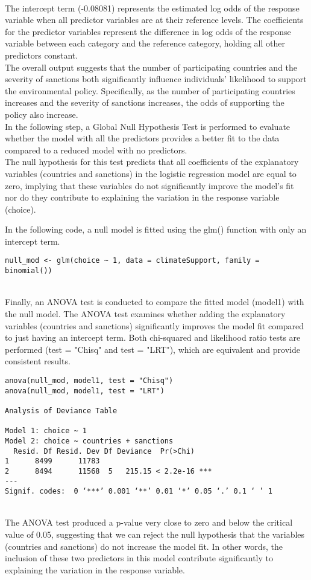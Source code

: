 \documentclass[oneside]{article}
\begin{document}
\\
The intercept term (-0.08081) represents the estimated log odds of the response variable when all predictor variables are at their reference levels.
The coefficients for the predictor variables represent the difference in log odds of the response variable between each category and the reference category, holding all other predictors constant.
\\
The overall output suggests that the number of participating countries and the severity of sanctions both significantly influence individuals' likelihood to support the environmental policy. Specifically, as the number of participating countries increases and the severity of sanctions increases, the odds of supporting the policy also increase.
\\
In the following step, a Global Null Hypothesis Test is performed to evaluate whether the model with all the predictors provides a better fit to the data compared to a reduced model with no predictors.
\\
The null hypothesis for this test predicts that all coefficients of the explanatory variables (countries and sanctions) in the logistic regression model are equal to zero, implying that these variables do not significantly improve the model's fit nor do they contribute to explaining the variation in the response variable (choice).

\vspace{.5cm}
\noindent
In the following code, a null model is fitted using the glm() function with only an intercept term.
\begin{verbatim}
null_mod <- glm(choice ~ 1, data = climateSupport, family = binomial())  
\end{verbatim}
\\
Finally, an ANOVA test is conducted to compare the fitted model (model1) with the null model. The ANOVA test examines whether adding the explanatory variables (countries and sanctions) significantly improves the model fit compared to just having an intercept term. Both chi-squared and likelihood ratio tests are performed (test = "Chisq" and test = "LRT"), which are equivalent and provide consistent results.
\begin{verbatim}
anova(null_mod, model1, test = "Chisq")
anova(null_mod, model1, test = "LRT")

Analysis of Deviance Table

Model 1: choice ~ 1
Model 2: choice ~ countries + sanctions
  Resid. Df Resid. Dev Df Deviance  Pr(>Chi)    
1      8499      11783                          
2      8494      11568  5   215.15 < 2.2e-16 ***
---
Signif. codes:  0 ‘***’ 0.001 ‘**’ 0.01 ‘*’ 0.05 ‘.’ 0.1 ‘ ’ 1
\end{verbatim}
\\
The ANOVA test produced a p-value very close to zero and below the critical value of 0.05, suggesting that we can reject the null hypothesis that the variables (countries and sanctions) do not increase the model fit. In other words, the inclusion of these two predictors in this model contribute significantly to explaining the variation in the response variable.
\end{document}
